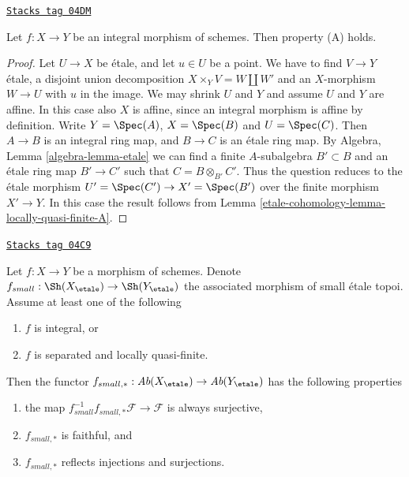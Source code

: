 \begin{lemma}[Integral A]
\label{etale-cohomology-lemma-integral-A}
\href{https://stacks.math.columbia.edu/tag/04DM}{\texttt{Stacks tag 04DM}}

Let $f : X \to Y$ be an integral morphism of schemes.
Then property (A) holds.
\end{lemma}

\begin{proof}
Let $U \to X$ be \'etale, and let $u \in U$ be a point.
We have to find $V \to Y$ \'etale, a disjoint union decomposition
$X \times_Y V = W \amalg W'$ and an $X$-morphism $W \to U$
with $u$ in the image. We may shrink $U$ and $Y$ and assume
$U$ and $Y$ are affine. In this case also $X$ is affine, since
an integral morphism is affine by definition. Write $Y = \Spec(A)$,
$X = \Spec(B)$ and $U = \Spec(C)$. Then $A \to B$ is an
integral ring map, and $B \to C$ is an \'etale ring map. By
Algebra, Lemma \ref{algebra-lemma-etale}
we can find a finite $A$-subalgebra $B' \subset B$ and an \'etale ring
map $B' \to C'$ such that $C = B \otimes_{B'} C'$. Thus the question
reduces to the \'etale morphism
$U' = \Spec(C') \to X' = \Spec(B')$
over the finite morphism $X' \to Y$. In this case the result follows from
Lemma \ref{etale-cohomology-lemma-locally-quasi-finite-A}.
\end{proof}

\begin{lemma}
\label{etale-cohomology-lemma-when-push-pull-surjective}
\href{https://stacks.math.columbia.edu/tag/04C9}{\texttt{Stacks tag 04C9}}

Let $f : X \to Y$ be a morphism of schemes. Denote
$f_{small} :
\Sh(X_\etale)
\to
\Sh(Y_\etale)$
the associated morphism of small \'etale topoi. Assume at least one
of the following
\begin{enumerate}
\item $f$ is integral, or
\item $f$ is separated and locally quasi-finite.
\end{enumerate}
Then the functor
$f_{small, *} :
\textit{Ab}(X_\etale)
\to
\textit{Ab}(Y_\etale)$
has the following properties
\begin{enumerate}
\item the map
$f_{small}^{-1}f_{small, *}\mathcal{F} \to \mathcal{F}$
is always surjective,
\item $f_{small, *}$ is faithful, and
\item $f_{small, *}$ reflects injections and surjections.
\end{enumerate}
\end{lemma}

